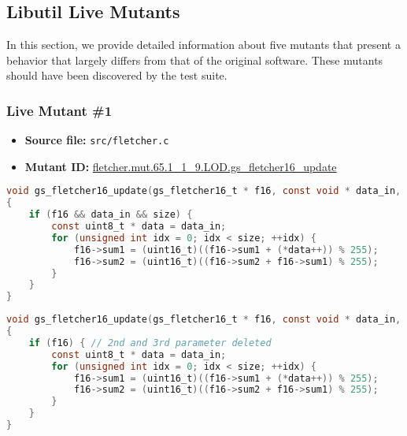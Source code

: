 

\subsection{Libutil Live Mutants}

In this section, we provide detailed information about five mutants that present a behavior that largely differs from that of the original software. These mutants should have been discovered by the test suite.

\subsubsection{Live Mutant \#1}

\begin{itemize}
\item \textbf{Source file:} \texttt{src/fletcher.c}
\item \textbf{Mutant ID:} \url{fletcher.mut.65.1_1_9.LOD.gs_fletcher16_update}
\end{itemize}

\begin{lstlisting}[language=C, label=live_1, caption=Original source code.]
void gs_fletcher16_update(gs_fletcher16_t * f16, const void * data_in, size_t size)
{
    if (f16 && data_in && size) {
        const uint8_t * data = data_in;
        for (unsigned int idx = 0; idx < size; ++idx) {
            f16->sum1 = (uint16_t)((f16->sum1 + (*data++)) % 255);
            f16->sum2 = (uint16_t)((f16->sum2 + f16->sum1) % 255);
        }
    }
}
\end{lstlisting}

\begin{lstlisting}[language=C, label=live_1, caption=Mutant source code.]
void gs_fletcher16_update(gs_fletcher16_t * f16, const void * data_in, size_t size)
{
    if (f16) { // 2nd and 3rd parameter deleted
        const uint8_t * data = data_in;
        for (unsigned int idx = 0; idx < size; ++idx) {
            f16->sum1 = (uint16_t)((f16->sum1 + (*data++)) % 255);
            f16->sum2 = (uint16_t)((f16->sum2 + f16->sum1) % 255);
        }
    }
}
\end{lstlisting}




